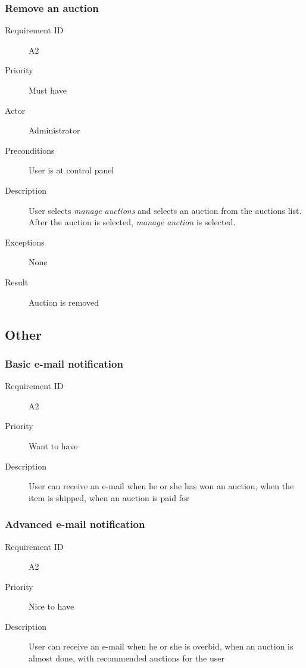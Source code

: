 		\subsubsection{Remove an auction}
			\begin{description}
				\item[Requirement ID] A2
				\item[Priority] Must have
				\item[Actor] Administrator
				\item[Preconditions] User is at control panel
				\item[Description] User selects \emph{manage auctions} and selects an auction from the auctions 
				list. After the auction is selected, \emph{manage auction} is selected.
				\item[Exceptions] None
				\item[Result] Auction is removed
			\end{description}	
	\subsection{Other}
		\subsubsection{Basic e-mail notification}
			\begin{description}
				\item[Requirement ID] A2
				\item[Priority] Want to have
				\item[Description] User can receive an e-mail when he or she has won an auction,
					when the item is shipped, when an auction is paid for
			\end{description}
		\subsubsection{Advanced e-mail notification}
			\begin{description}
				\item[Requirement ID] A2
				\item[Priority] Nice to have
				\item[Description] User can receive an e-mail when he or she is overbid,
					when an auction is almost done, with recommended auctions for the user
			\end{description}

